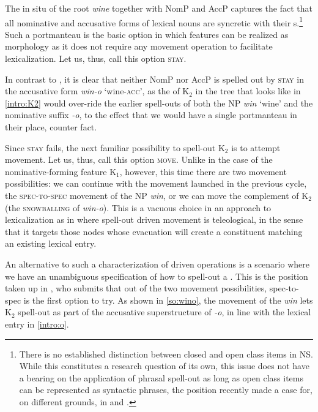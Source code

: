 \noindent
The in situ  of the root \textit{wine} together with NomP and AccP captures the fact that all nominative and accusative forms of  lexical nouns are syncretic with their s.\footnote{There is no established distinction between closed and open class items in  NS. While this constitutes a research question of its own, this issue does not have a bearing on the application of phrasal spell-out as long as open class items can be represented as syntactic phrases, the position recently made a case for, on different grounds, in \cite{NU} and \cite{CCW2017}.
} %
Such a portmanteau  is the basic option in which features can be realized as morphology as it does not require any movement operation to facilitate  lexicalization. Let us, thus, call this option \textsc{stay}.
\par
In contrast to , it is clear that neither NomP nor AccP is spelled out by \textsc{stay} in the  accusative form \textit{win-o} `wine-\textsc{acc}', as the  of K$_{2}$ in the tree that looks like in \ref{intro:K2} would over-ride the earlier spell-outs of both the NP  \textit{win} `wine' and the nominative suffix \textit{-o}, to the effect that we would have a single portmanteau  in their place, counter fact.
\par Since \textsc{stay} fails, the next familiar possibility to spell-out K$_{2}$ is to attempt movement. Let us, thus, call this option \textsc{move}. Unlike in the case of the nominative-forming feature K$_{1}$, however, this time there are two movement possibilities: we can continue with the movement launched in the previous cycle, the \textsc{\textsc{spec-to-spec}} movement of the NP \textit{win}, or we can move the complement of K$_{2}$ (the \textsc{snowballing} of \textit{win-o}). This is a vacuous choice in an approach to lexicalization as in \cite{Caha2011} where spell-out driven movement is teleological, in the sense that it targets those nodes whose evacuation will create a constituent matching an existing lexical entry.
\par An alternative to such a characterization of  driven operations is a scenario where we have an unambiguous specification of how to spell-out a . This is the position taken up in \cite{Starke2018}, who submits that out of the two movement possibilities, spec-to-spec is the first option to try. As shown in \ref{so:wino}, the movement of the  \textit{win} lets K$_{2}$ spell-out as part of the accusative superstructure of \textit{-o}, in line with the lexical entry in \ref{intro:o}.  



